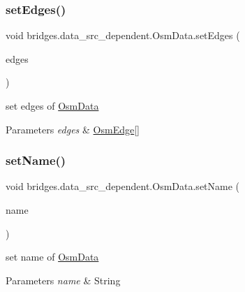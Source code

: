 \subsubsection{\texorpdfstring{set\+Edges()}{setEdges()}}
{\footnotesize\ttfamily void bridges.\+data\+\_\+src\+\_\+dependent.\+Osm\+Data.\+set\+Edges (\begin{DoxyParamCaption}\item[{\hyperlink{classbridges_1_1data__src__dependent_1_1_osm_edge}{Osm\+Edge} \mbox{[}$\,$\mbox{]}}]{edges }\end{DoxyParamCaption})}

set edges of \hyperlink{classbridges_1_1data__src__dependent_1_1_osm_data}{Osm\+Data} 
\begin{DoxyParams}{Parameters}
{\em edges} & \hyperlink{classbridges_1_1data__src__dependent_1_1_osm_edge}{Osm\+Edge}\mbox{[}\mbox{]} \\
\hline
\end{DoxyParams}
\mbox{\label{classbridges_1_1data__src__dependent_1_1_osm_data_abdc3131be4ca17fcf53a5728a7932bda}} 
\subsubsection{\texorpdfstring{set\+Name()}{setName()}}
{\footnotesize\ttfamily void bridges.\+data\+\_\+src\+\_\+dependent.\+Osm\+Data.\+set\+Name (\begin{DoxyParamCaption}\item[{String}]{name }\end{DoxyParamCaption})}

set name of \hyperlink{classbridges_1_1data__src__dependent_1_1_osm_data}{Osm\+Data} 
\begin{DoxyParams}{Parameters}
{\em name} & String \\
\hline
\end{DoxyParams}
\mbox{\label{classbridges_1_1data__src__dependent_1_1_osm_data_ad31b467d79dd0b76f75f93b5e192e1e3}} 
